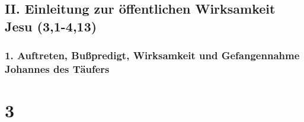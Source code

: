 \hypertarget{ii.-einleitung-zur-uxf6ffentlichen-wirksamkeit-jesu-31-413}{%
\subsection{II. Einleitung zur öffentlichen Wirksamkeit Jesu
(3,1-4,13)}\label{ii.-einleitung-zur-uxf6ffentlichen-wirksamkeit-jesu-31-413}}

\hypertarget{auftreten-buuxdfpredigt-wirksamkeit-und-gefangennahme-johannes-des-tuxe4ufers}{%
\subsubsection{1. Auftreten, Bußpredigt, Wirksamkeit und Gefangennahme
Johannes des
Täufers}\label{auftreten-buuxdfpredigt-wirksamkeit-und-gefangennahme-johannes-des-tuxe4ufers}}

\hypertarget{section-2}{%
\section{3}\label{section-2}}

